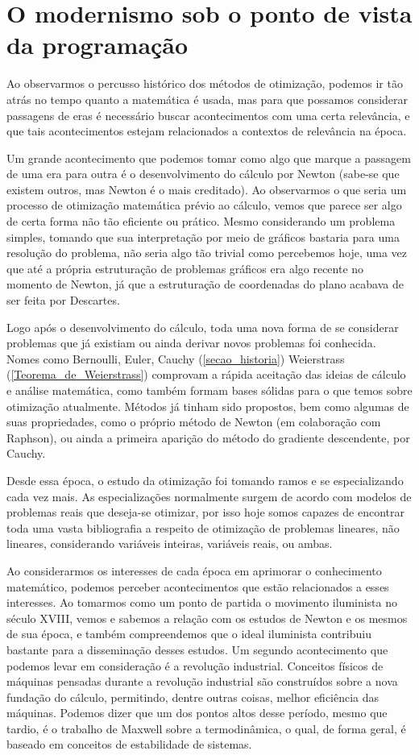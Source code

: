 \section{O modernismo sob o ponto de vista da programação}

\noindent
Ao observarmos o percusso histórico dos métodos de otimização, podemos ir tão atrás no tempo
quanto a matemática é usada, mas para que possamos considerar passagens de eras é necessário
buscar acontecimentos com uma certa relevância, e que tais acontecimentos estejam relacionados
a contextos de relevância na época.

Um grande acontecimento que podemos tomar como algo que marque a passagem de uma era para
outra é o desenvolvimento do cálculo por Newton (sabe-se que existem outros, mas Newton é
o mais creditado). Ao observarmos o que seria um processo de otimização matemática prévio
ao cálculo, vemos que parece ser algo de certa forma não tão eficiente ou prático. Mesmo
considerando um problema simples, tomando que sua interpretação por meio de gráficos bastaria
para uma resolução do problema, não seria algo tão trivial como percebemos hoje, uma vez
que até a própria estruturação de problemas gráficos era algo recente no momento de Newton,
já que a estruturação de coordenadas do plano acabava de ser feita por Descartes.

Logo após o desenvolvimento do cálculo, toda uma nova forma de se considerar problemas
que já existiam ou ainda derivar novos problemas foi conhecida. Nomes como Bernoulli, Euler,
Cauchy (\ref{secao_historia}) Weierstrass (\ref{Teorema_de_Weierstrass}) comprovam a rápida
aceitação das ideias de cálculo e análise matemática, como também formam bases sólidas para
o que temos sobre otimização atualmente. Métodos já tinham sido propostos, bem como algumas
de suas propriedades, como o próprio método de Newton (em colaboração com Raphson), ou ainda
a primeira aparição do método do gradiente descendente, por Cauchy.

Desde essa época, o estudo da otimização foi tomando ramos e se especializando cada vez mais.
As especializações normalmente surgem de acordo com modelos de problemas reais que deseja-se
otimizar, por isso hoje somos capazes de encontrar toda uma vasta bibliografia a respeito de
otimização de problemas lineares, não lineares, considerando variáveis inteiras, variáveis
reais, ou ambas.

Ao considerarmos os interesses de cada época em aprimorar o conhecimento matemático, podemos
perceber acontecimentos que estão relacionados a esses interesses. Ao tomarmos como um ponto
de partida o movimento iluminista no século XVIII, vemos e sabemos a relação com os estudos
de Newton e os mesmos de sua época, e também compreendemos que o ideal iluminista contribuiu
bastante para a disseminação desses estudos. Um segundo acontecimento que podemos levar em
consideração é a revolução industrial. Conceitos físicos de máquinas pensadas durante a
revolução industrial são construídos sobre a nova fundação do cálculo, permitindo, dentre
outras coisas, melhor eficiência das máquinas. Podemos dizer que um dos pontos altos desse
período, mesmo que tardio, é o trabalho de Maxwell sobre a termodinâmica, o qual, de forma
geral, é baseado em conceitos de estabilidade de sistemas.


